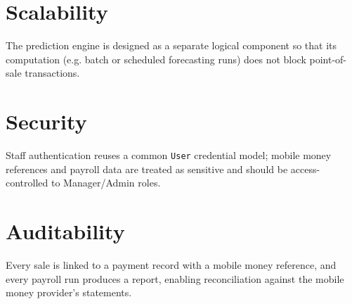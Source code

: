 \documentclass[11pt,a4paper]{report}
\begin{document}
\section{Scalability}
The prediction engine is designed as a separate logical component so that its computation (e.g. batch or scheduled forecasting runs) does not block point-of-sale transactions.

\section{Security}
Staff authentication reuses a common \texttt{User} credential model; mobile money references and payroll data are treated as sensitive and should be access-controlled to Manager/Admin roles.

\section{Auditability}
Every sale is linked to a payment record with a mobile money reference, and every payroll run produces a report, enabling reconciliation against the mobile money provider's statements.
\end{document}
